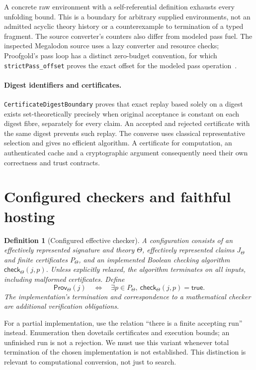 \documentclass[11pt]{article}
\newtheorem{definition}{Definition}
\newcommand{\proofCheck}{\mathsf{check}}
\newcommand{\Prov}{\mathsf{Prov}}
\newcommand{\code}[1]{\nolinkurl{#1}}
\begin{document}
A concrete raw environment with a self-referential definition exhausts every
unfolding bound. This is a boundary for arbitrary supplied environments, not
an admitted acyclic theory history or a counterexample to termination of a
typed fragment. The source converter's counters also differ from modeled
pass fuel. The inspected Megalodon source uses a lazy converter and resource
checks; Proofgold's pass loop has a distinct zero-budget convention, for which
\code{strictPass_offset} proves the exact offset for the modeled pass
operation~\cite{megalodonsource,mathdatapfgsource}.

\paragraph{Digest identifiers and certificates.}
\code{CertificateDigestBoundary} proves that exact replay based solely on a
digest exists set-theoretically precisely when original acceptance is constant
on each digest fibre, separately for every claim. An accepted and rejected
certificate with the same digest prevents such replay. The converse uses
classical representative selection and gives no efficient algorithm. A
certificate for computation, an authenticated cache and a cryptographic
argument consequently need their own correctness and trust contracts.

\section{Configured checkers and faithful hosting}
\begin{definition}[Configured effective checker]
A configuration consists of an effectively represented signature and theory
$\Theta$, effectively represented claims $J_\Theta$ and finite certificates
$P_\Theta$, and an implemented Boolean checking algorithm
$\proofCheck_\Theta(j,p)$. Unless explicitly relaxed, the algorithm terminates on
\emph{all} inputs, including malformed certificates. Define
\[
 \Prov_\Theta(j) \quad\Longleftrightarrow\quad
 \exists p\in P_\Theta,\ \proofCheck_\Theta(j,p)=\mathsf{true}.
\]
The implementation's termination and correspondence to a mathematical
checker are additional verification obligations.
\end{definition}
For a partial implementation, use the relation ``there is a finite
accepting run'' instead. Enumeration then dovetails certificates and
execution bounds; an unfinished run is not a rejection. We must use this
variant whenever total termination of the chosen implementation is not
established. This distinction is relevant to computational conversion,
not just to search.
\end{document}
